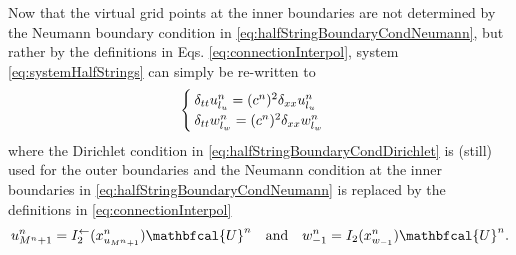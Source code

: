 \SWcomment[***$\rightarrow$]Now that the virtual grid points at the inner boundaries are not determined by the Neumann boundary condition in \eqref{eq:halfStringBoundaryCondNeumann}, but rather by the definitions in Eqs. \eqref{eq:connectionInterpol}, system \eqref{eq:systemHalfStrings} can simply be re-written to
\begin{equation}\label{eq:FDSwithMethod}
    \begin{cases}
        \delta_{tt}u_{l_u}^n = (c^n)^2\delta_{xx}u_{l_u}^n\\
        \delta_{tt}w_{l_w}^n = (c^n)^2\delta_{xx}w_{l_w}^n
    \end{cases}
\end{equation}
where the Dirichlet condition in \eqref{eq:halfStringBoundaryCondDirichlet} is (still) used for the outer boundaries and the Neumann condition at the inner boundaries in \eqref{eq:halfStringBoundaryCondNeumann} is replaced by the definitions in \eqref{eq:connectionInterpol}
\begin{equation}
        u_{M^n+1}^n = I_2^\flip(x_{u_{M^n+1}}^n)\mathbfcal{U}^n \quad \text{and}\quad w_{-1}^n = I_2(x_{w_{-1}}^n)\mathbfcal{U}^n.
\end{equation}
\SWcomment[$\leftarrow$***]


